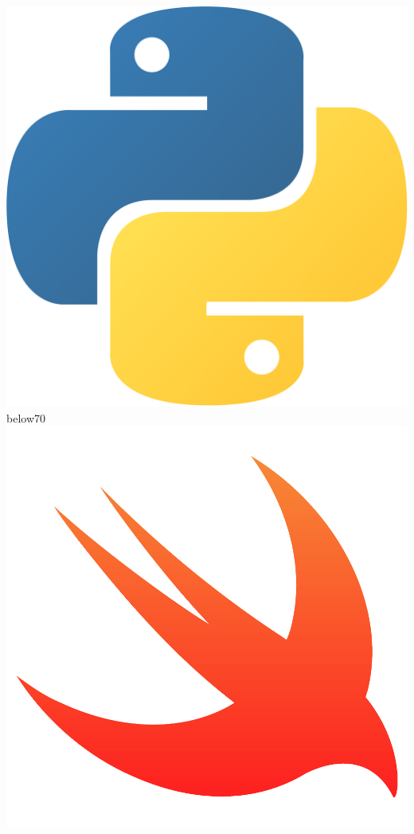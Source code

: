 \documentclass[blue]{pastelcv}              %
\begin{document}
\begin{paracol}{2}
  {\large\bf \includegraphics[width=\iconsizep]{python}}
  {}{below}{70}
  {\large\bf \includegraphics[width=\iconsizep]{swift}}

\end{paracol}
\end{document}
